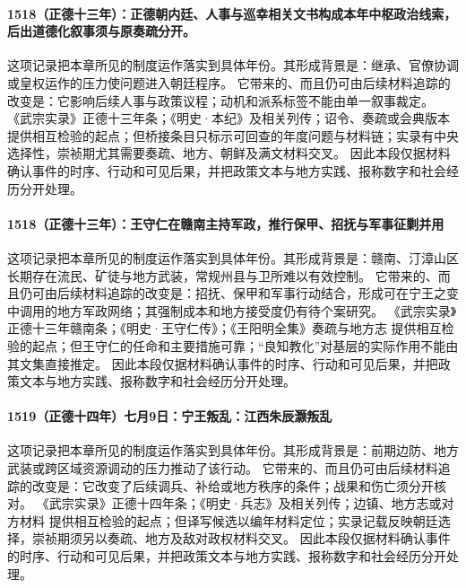 \paragraph{1518（正德十三年）：正德朝内廷、人事与巡幸相关文书构成本年中枢政治线索，后出道德化叙事须与原奏疏分开。} 这项记录把本章所见的制度运作落实到具体年份。其形成背景是：继承、官僚协调或皇权运作的压力使问题进入朝廷程序。 它带来的、而且仍可由后续材料追踪的改变是：它影响后续人事与政策议程；动机和派系标签不能由单一叙事裁定。 《武宗实录》正德十三年条；《明史·本纪》及相关列传；诏令、奏疏或会典版本 提供相互检验的起点；但桥接条目只标示可回查的年度问题与材料链；实录有中央选择性，崇祯期尤其需要奏疏、地方、朝鲜及满文材料交叉。 因此本段仅据材料确认事件的时序、行动和可见后果，并把政策文本与地方实践、报称数字和社会经历分开处理。

\paragraph{1518（正德十三年）：王守仁在赣南主持军政，推行保甲、招抚与军事征剿并用} 这项记录把本章所见的制度运作落实到具体年份。其形成背景是：赣南、汀漳山区长期存在流民、矿徒与地方武装，常规州县与卫所难以有效控制。 它带来的、而且仍可由后续材料追踪的改变是：招抚、保甲和军事行动结合，形成可在宁王之变中调用的地方军政网络；其强制成本和地方接受度仍有待个案研究。 《武宗实录》正德十三年赣南条；《明史·王守仁传》；《王阳明全集》奏疏与地方志 提供相互检验的起点；但王守仁的任命和主要措施可靠；“良知教化”对基层的实际作用不能由其文集直接推定。 因此本段仅据材料确认事件的时序、行动和可见后果，并把政策文本与地方实践、报称数字和社会经历分开处理。

\paragraph{1519（正德十四年）七月9日：宁王叛乱：江西朱辰灏叛乱} 这项记录把本章所见的制度运作落实到具体年份。其形成背景是：前期边防、地方武装或跨区域资源调动的压力推动了该行动。 它带来的、而且仍可由后续材料追踪的改变是：它改变了后续调兵、补给或地方秩序的条件；战果和伤亡须分开核对。 《武宗实录》正德十四年条；《明史·兵志》及相关列传；边镇、地方志或对方材料 提供相互检验的起点；但译写候选以编年材料定位；实录记载反映朝廷选择，崇祯期须另以奏疏、地方及敌对政权材料交叉。 因此本段仅据材料确认事件的时序、行动和可见后果，并把政策文本与地方实践、报称数字和社会经历分开处理。

